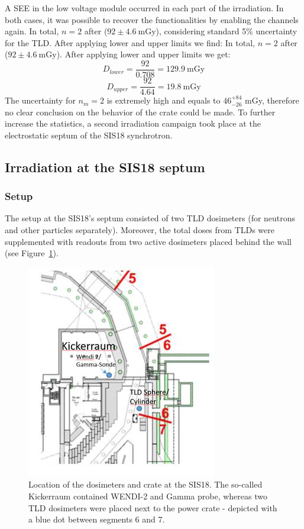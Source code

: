 A \gls{SEE} in the low voltage module occurred in each part of the irradiation. In both cases, it was possible to recover the functionalities by enabling the channels again. In total, $n=2$ after ($92\pm{4.6}\mathrm{\ mGy}$), considering standard 5\% uncertainty for the TLD. After applying lower and upper limits we find:
In total, $n=2$ after ($92\pm{4.6}\mathrm{\ mGy}$).
After applying lower and upper limits we get:
\begin{equation}
    D_{lower}=\frac{92}{0.708} = 129.9\mathrm{\ mGy}
\end{equation}
\begin{equation}
    D_{upper}=\frac{92}{4.64} = 19.8\mathrm{\ mGy}
\end{equation}
The uncertainty for $n_{m}=2$ is extremely high and equals to $\mathrm{46}_{-26}^{+84}$ mGy, therefore no clear conclusion on the behavior of the crate could be made. To further increase the statistics, a second irradiation campaign took place at the electrostatic septum of the SIS18 synchrotron. 
\subsection{Irradiation at the SIS18 septum}
\subsubsection{Setup}
The setup at the SIS18's septum consisted of two \gls{TLD} dosimeters (for neutrons and other particles separately). Moreover, the total doses from TLDs were supplemented with readouts from two active dosimeters placed behind the wall (see Figure~\ref{fig:spec_des}). 
\begin{figure}[!ht]
    \centering
    \includegraphics[width=0.45\columnwidth]{Chapter3/Irradiation/images/septum.jpg}
    \caption{Location of the dosimeters and crate at the SIS18. The so-called Kickerraum contained WENDI-2 and Gamma probe, whereas two TLD dosimeters were placed next to the power crate - depicted with a blue dot between segments 6 and 7.}
    \label{fig:spec_des}
\end{figure}

